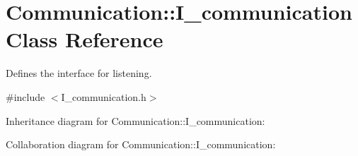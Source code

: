 \hypertarget{classCommunication_1_1I__communication}{}\section{Communication\+::I\+\_\+communication Class Reference}
\label{classCommunication_1_1I__communication}


Defines the interface for listening.  




{\ttfamily \#include $<$I\+\_\+communication.\+h$>$}



Inheritance diagram for Communication\+::I\+\_\+communication\+:


Collaboration diagram for Communication\+::I\+\_\+communication\+:
